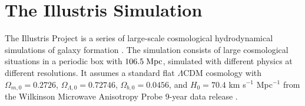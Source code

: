 \section{The Illustris Simulation}

\label{sec:illustris}The Illustris Project is a series of large-scale
cosmological hydrodynamical simulations of galaxy formation \citep{vogelsberger2014properties}.
The simulation consists of large cosmological situations in a periodic
box with $106.5\;{\rm Mpc}$, simulated with different physics at
different resolutions. It assumes a standard flat $\Lambda$CDM cosmology
with $\Omega_{m,0}=0.2726$, $\Omega_{\Lambda,0}=0.72746$, $\Omega_{b,0}=0.0456$,
and $H_{0}=70.4$ km s$^{-1}$ Mpc$^{-1}$ from the Wilkinson Microwave
Anisotropy Probe 9-year data release \citep{hinshaw2013nineyear}.

